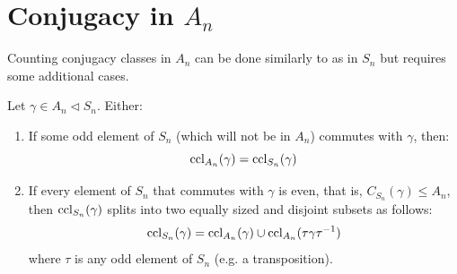 \documentclass[../main.tex]{subfiles}
\begin{document}
\section{Conjugacy in \texorpdfstring{$A_n$}{Alternating Groups}}
Counting conjugacy classes in $A_n$ can be done similarly to as in $S_n$ but requires some additional cases.
\begin{lemma}
  Let $\gamma \in A_n \lhd S_n$. Either: \label{conjugacyAn}
  \begin{enumerate}
    \item If some odd element of $S_n$ (which will not be in $A_n$) commutes with $\gamma$, then:
      \[
        \operatorname{ccl}_{A_n}(\gamma) = \operatorname{ccl}_{S_n}(\gamma)
      \]
    \item If every element of $S_n$ that commutes with $\gamma$ is even, that is, $C_{S_n}(\gamma) \leq A_n$, then $\operatorname{ccl}_{S_n}(\gamma)$ splits into two equally sized and disjoint subsets as follows:
      \[
        \operatorname{ccl}_{S_n}(\gamma) = \operatorname{ccl}_{A_n}(\gamma) \cup \operatorname{ccl}_{A_n}(\tau \gamma \tau^{-1})
      \]
      where $\tau$ is any odd element of $S_n$ (e.g. a transposition).
  \end{enumerate}
\end{lemma}
\end{document}
